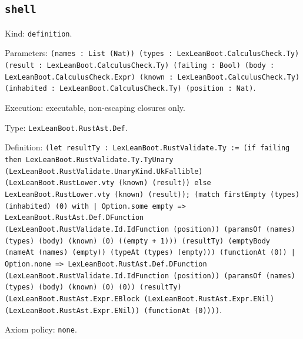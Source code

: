 \documentclass[11pt]{article}
\begin{document}
\subsection*{\texttt{shell}}
\noindent Kind: \texttt{definition}.\par
\noindent Parameters: \texttt{(names : List (Nat)) (types : LexLeanBoot.CalculusCheck.Ty) (result : LexLeanBoot.CalculusCheck.Ty) (failing : Bool) (body : LexLeanBoot.CalculusCheck.Expr) (known : LexLeanBoot.CalculusCheck.Ty) (inhabited : LexLeanBoot.CalculusCheck.Ty) (position : Nat)}.\par
\noindent Execution: executable, non-escaping closures only.\par
\noindent Type: \texttt{LexLeanBoot.RustAst.Def}.\par
\noindent Definition: \texttt{(let resultTy : LexLeanBoot.RustValidate.Ty := (if failing then LexLeanBoot.RustValidate.Ty.TyUnary (LexLeanBoot.RustValidate.UnaryKind.UkFallible) (LexLeanBoot.RustLower.vty (known) (result)) else LexLeanBoot.RustLower.vty (known) (result)); (match firstEmpty (types) (inhabited) (0) with | Option.some empty => LexLeanBoot.RustAst.Def.DFunction (LexLeanBoot.RustValidate.Id.IdFunction (position)) (paramsOf (names) (types) (body) (known) (0) ((empty + 1))) (resultTy) (emptyBody (nameAt (names) (empty)) (typeAt (types) (empty))) (functionAt (0)) | Option.none => LexLeanBoot.RustAst.Def.DFunction (LexLeanBoot.RustValidate.Id.IdFunction (position)) (paramsOf (names) (types) (body) (known) (0) (0)) (resultTy) (LexLeanBoot.RustAst.Expr.EBlock (LexLeanBoot.RustAst.Expr.ENil) (LexLeanBoot.RustAst.Expr.ENil)) (functionAt (0))))}.\par
\noindent Axiom policy: \texttt{none}.\par
\end{document}
